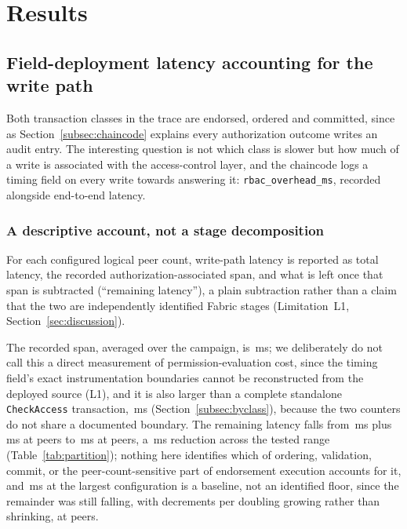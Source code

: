 \documentclass[a4paper,fleqn]{cas-sc}
\begin{document}
\FloatBarrier
\section{Results}
\label{sec:results}

\subsection{Field-deployment latency accounting for the write path}
\label{subsec:decomposition}

Both transaction classes in the trace are endorsed, ordered and committed,
since as Section~\ref{subsec:chaincode} explains every authorization outcome
writes an audit entry. The interesting question is not which class is
slower but how much of a write is associated with the access-control layer,
and the chaincode logs a timing field on every write towards answering it:
\texttt{rbac\_overhead\_ms}, recorded alongside end-to-end latency.

\subsubsection{A descriptive account, not a stage decomposition}
\label{subsubsec:partition}

For each configured logical peer count, write-path latency is reported as
total latency, the recorded authorization-associated span, and what is
left once that span is subtracted (``remaining latency''), a plain
subtraction rather than a claim that the two are independently identified
Fabric stages (Limitation~L1, Section~\ref{sec:discussion}).

The recorded span, averaged over the campaign, is \PartAccess\,ms; we
deliberately do not call this a direct measurement of permission-evaluation
cost, since the timing field's exact instrumentation boundaries cannot be
reconstructed from the deployed source (L1), and it is also larger than a
complete standalone \texttt{CheckAccess} transaction, \DecisionMean\,ms
(Section~\ref{subsec:byclass}), because the two counters do not share a
documented boundary. The remaining latency falls from \PartRemainder\,ms
plus \PartEndorser\,ms at \ScaleMinPeers{} peers to \PartRemainder\,ms at
\ScaleMaxPeers{} peers, a \PartEndorser\,ms reduction across the tested
range (Table~\ref{tab:partition}); nothing here identifies which of
ordering, validation, commit, or the peer-count-sensitive part of
endorsement execution accounts for it, and \PartRemainder\,ms at the
largest configuration is a baseline, not an identified floor, since the
remainder was still falling, with decrements per doubling growing rather
than shrinking, at \ScaleMaxPeers{} peers.
\end{document}
